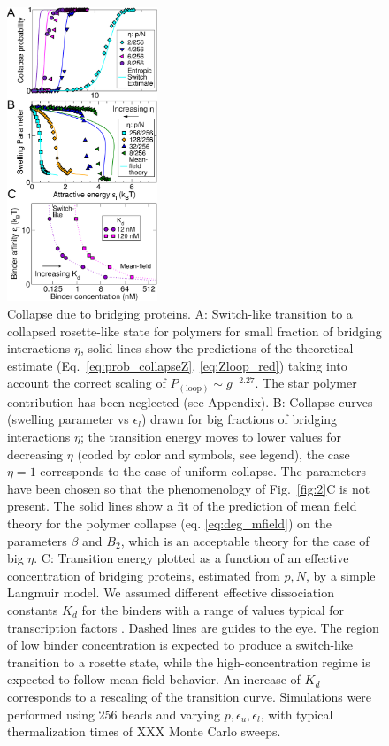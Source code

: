 \documentclass[
preprint,
a4paper,
12pt,
superscriptaddress,
pre]{revtex4}
\begin{document}
\begin{figure}
  \centering
  \includegraphics[width=0.4\textwidth]{fig3}
  \caption{Collapse due to bridging proteins.  A: Switch-like
    transition to a collapsed rosette-like state for polymers for
    small fraction of 
    bridging interactions $\eta$, solid lines show the predictions of
    the theoretical estimate (Eq.~\ref{eq:prob_collapseZ},
    \ref{eq:Zloop_red})
    taking into
    account the correct scaling of
    $P_\mathrm{(loop)} \sim g^{-2.27}$. The star polymer
    contribution has been neglected (see Appendix).
%
B: Collapse curves (swelling parameter vs
    $\epsilon_l$) drawn for big fractions of bridging
    interactions $\eta$; the transition energy moves to
    lower values for decreasing $\eta$ (coded by color and
    symbols, see legend), the case $\eta=1$ corresponds to the case of
    uniform collapse. The parameters have been chosen so that the
    phenomenology of Fig.~\ref{fig:2}C is not present. The solid lines
    show a fit of the prediction of mean field theory for the polymer
    collapse (eq. \ref{eq:deg_mfield}) on the parameters $\beta$ and
    $B_2$, which is an acceptable theory for the case of big $\eta$.
C:  Transition energy plotted as a function of an effective
concentration  of bridging proteins, estimated  from $p,N$, by a
simple 
Langmuir model. We assumed different effective dissociation constants $K_d$ 
for the binders with a range of values typical for transcription
factors \cite{Buchler29042003}. Dashed lines are guides to the
eye. The region of low binder concentration is expected to produce a
switch-like transition to a rosette state, while the
high-concentration regime is expected to follow mean-field behavior. An
increase of $K_d$ corresponds to a rescaling of the transition curve. 
%
Simulations were performed using 256 beads and varying
$p,\epsilon_u,\epsilon_l$, with typical thermalization times of XXX
Monte Carlo sweeps.  }
  \label{fig:3}
\end{figure}
\end{document}
